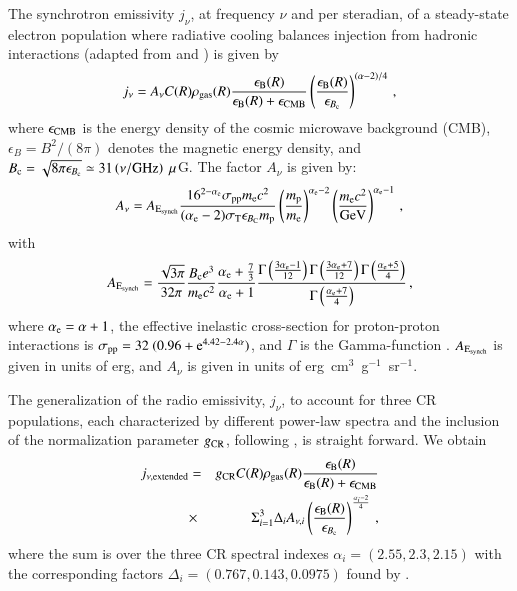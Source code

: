 \documentclass[useAMS,usenatbib]{mn2e}
\begin{document}
\begin{appendix}
The synchrotron emissivity $j_{\nu}$, at frequency $\nu$ and per
steradian, of a steady-state electron population where radiative cooling
balances injection from hadronic interactions (adapted from
\citealp{2008MNRAS.385.1211P} and \citealp{2011A&A...527A..99E})
is given by
%
\begin{equation}
j_{\nu}  =  A_\nu C(R) \rho_{{\mathrm{gas}}}(R) 
\frac{\epsilon_{{\mathrm{B}}}(R)}{\epsilon_{{\mathrm{B}}}(R)+\epsilon_{{\mathrm{CMB}}}} 
\left( \frac{\epsilon_{{\mathrm{B}}}(R)}{\epsilon_{B_{{\mathrm{c}}}}} \right)^{(\alpha-2)/4} \, ,
\label{eq:jnu}
\end{equation}
%
where $\epsilon_{{\mathrm{CMB}}}$ is the energy density of the cosmic microwave 
background (CMB), $\epsilon_B=B^{2}/(8\pi)$ denotes the magnetic
energy density, and $B_{{\mathrm{c}}} = \sqrt{ 8 \pi
  \epsilon_{B_{{\mathrm{c}}}}} \simeq 31 \left( \nu/{\mathrm{GHz}} \right)~\mu$G. 
%
The factor $A_{\nu}$ is given by: 
%
\begin{equation}
A_{\nu} = A_{{\mathrm{E_{synch}}}} \frac{16^{2-\alpha_{{\mathrm{e}}}}\sigma_{{\mathrm{pp}}}m_{{\mathrm{e}}}c^{2}}{(\alpha_{{\mathrm{e}}}-2)\sigma_{{\mathrm{T}}}\epsilon_{B_{{\mathrm{C}}}}m_{{\mathrm{p}}}}\left(\frac{m_{{\mathrm{p}}}
}{m_{{\mathrm{e}}}}\right)^{\alpha_{{\mathrm{e}}}-2} \left(\frac{m_{{\mathrm{e}}}c^{2}}{{\mathrm{GeV}}}\right)^{\alpha_{{\mathrm{e}}}-1} \, ,
\end{equation}
%
with
%
\begin{equation}
A_{{\mathrm{E_{synch}}}} = \frac{\sqrt{3\pi}}{32\pi}\frac{B_{{\mathrm{c}}}e^{3}}{m_{{\mathrm{e}}}c^{2}}\frac{\alpha_{{\mathrm{e}}}+\frac{7}{3}}{\alpha_{{\mathrm{e}}}+1}\frac{\Gamma\left(\frac{3\alpha_{{\mathrm{e}}}-1}{12}\right)\Gamma\left(\frac{3\alpha_{{\mathrm{e}}}+7}{12}\right)\Gamma\left(\frac{\alpha_{{\mathrm{e}}}+5}{4}\right)}{\Gamma\left(\frac{\alpha_{{\mathrm{e}}}+7}{4}\right)} \, ,
\end{equation}
%
where $\alpha_{{\mathrm{e}}}=\alpha+1$, the effective inelastic cross-section for
proton-proton interactions is $\sigma_{{\mathrm{pp}}} =
32~(0.96+{\mathrm{e}}^{4.42-2.4\alpha})$, and
$\Gamma$ is the Gamma-function
\citep{1965hmfw.book.....A}. $A_{{\mathrm{E_{synch}}}}$ is given in units of erg, and
$A_{\nu}$ is given in units of erg~cm$^{3}$~g$^{-1}$~sr$^{-1}$.

The generalization of the radio emissivity, $j_{\nu}$, to account for three CR populations,
each characterized by different power-law spectra and the inclusion of the
normalization parameter $g_{{\mathrm{CR}}}$, following \cite{2010MNRAS.409..449P}, is
straight forward. We obtain
%
\begin{eqnarray}
j_{\nu,{\mathrm{extended}}} & = &g_{{\mathrm{CR}}} C(R) \rho_{{\mathrm{gas}}}(R) \frac{\epsilon_{{\mathrm{B}}}(R)}{\epsilon_{{\mathrm{B}}}(R)+\epsilon_{{\mathrm{CMB}}}} \nonumber \\
& \times & \Sigma_{i=1}^{3} \Delta_{i} A_{\nu,i} \left( \frac{\epsilon_{{\mathrm{B}}}(R)}{\epsilon_{B_{{\mathrm{c}}}}} \right)^{\frac{\alpha_{i}-2}{4}}  \, ,
\end{eqnarray}
%
where the sum is over the three CR spectral indexes $\alpha_{i}=(2.55,2.3,2.15)$
with the corresponding factors $\Delta_{i} = (0.767, 0.143, 0.0975)$ found by
\cite{2010MNRAS.409..449P}.
 


\end{appendix}
\end{document}
